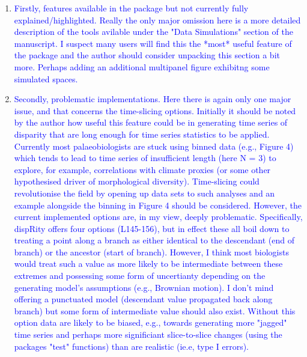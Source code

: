 \documentclass[12pt,letterpaper]{article}
\begin{document}
\begin{enumerate}
\item{\textcolor{blue}{Firstly, features available in the package but not currently fully explained/highlighted.
Really the only major omission here is a more detailed description of the tools avilable under the "Data Simulations" section of the manuscript.
I suspect many users will find this the *most* useful feature of the package and the author should consider unpacking this section a bit more.
Perhaps adding an additional multipanel figure exhibitng some simulated spaces.}}


\item{\textcolor{blue}{Secondly, problematic implementations.
Here there is again only one major issue, and that concerns the time-slicing options.
Initially it should be noted by the author how useful this feature could be in generating time series of disparity that are long enough for time series statistics to be applied.
Currently most palaeobiologists are stuck using binned data (e.g., Figure 4) which tends to lead to time series of insufficient length (here N = 3) to explore, for example, correlations with climate proxies (or some other hypothesised driver of morphological diversity).
Time-slicing could revolutionise the field by opening up data sets to such analyses and an example alongside the binning in Figure 4 should be considered.
However, the current implemented options are, in my view, deeply problematic.
Specifically, dispRity offers four options (L145-156), but in effect these all boil down to treating a point along a branch as either identical to the descendant (end of branch) or the ancestor (start of branch).
However, I think most biologists would treat such a value as more likely to be intermediate between these extremes and possessing some form of uncertianty depending on the generating model's assumptions (e.g., Brownian motion).
I don't mind offering a punctuated model (descendant value propagated back along branch) but some form of intermediate value should also exist.
Without this option data are likely to be biased, e.g., towards generating more "jagged" time series and perhaps more significiant slice-to-slice changes (using the packages "test" functions) than are realistic (ie.e, type I errors).}}



\end{enumerate}
\end{document}
